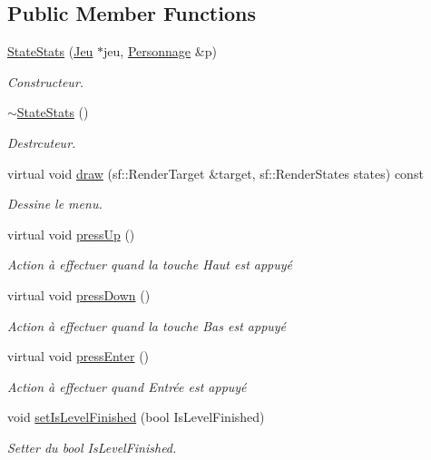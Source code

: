 \subsection*{Public Member Functions}
\begin{DoxyCompactItemize}
\item 
\hyperlink{class_state_stats_a01c0e31ffe6a1b8d9af8ca9c752fd29d}{State\+Stats} (\hyperlink{class_jeu}{Jeu} $\ast$jeu, \hyperlink{class_personnage}{Personnage} \&p)
\begin{DoxyCompactList}\small\item\em Constructeur. \end{DoxyCompactList}\item 
\hyperlink{class_state_stats_a1af5ae0229dfffd6586a54165c6af8b3}{$\sim$\+State\+Stats} ()
\begin{DoxyCompactList}\small\item\em Destrcuteur. \end{DoxyCompactList}\item 
virtual void \hyperlink{class_state_stats_ae8ee0b50f030d3057b0635158c170715}{draw} (sf\+::\+Render\+Target \&target, sf\+::\+Render\+States states) const 
\begin{DoxyCompactList}\small\item\em Dessine le menu. \end{DoxyCompactList}\item 
virtual void \hyperlink{class_state_stats_a4fd39389aa2debf191b718dc750ccf8a}{press\+Up} ()
\begin{DoxyCompactList}\small\item\em Action à effectuer quand la touche Haut est appuyé \end{DoxyCompactList}\item 
virtual void \hyperlink{class_state_stats_ac19acb64e561b57a02a826328aa827f6}{press\+Down} ()
\begin{DoxyCompactList}\small\item\em Action à effectuer quand la touche Bas est appuyé \end{DoxyCompactList}\item 
virtual void \hyperlink{class_state_stats_a12a42d0bc1a2d43c48d76fe9e1e0fdfd}{press\+Enter} ()
\begin{DoxyCompactList}\small\item\em Action à effectuer quand Entrée est appuyé \end{DoxyCompactList}\item 
void \hyperlink{class_state_stats_ad2d1de74b1ea43a077a3088861ad1b62}{set\+Is\+Level\+Finished} (bool Is\+Level\+Finished)
\begin{DoxyCompactList}\small\item\em Setter du bool Is\+Level\+Finished. \end{DoxyCompactList}\end{DoxyCompactItemize}
